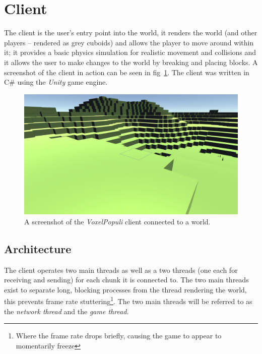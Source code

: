 \documentclass[12pt,notitlepage,a4paper]{report}
\newcommand{\unity}{\emph{Unity}}
\newcommand{\voxpop}{\emph{VoxelPopuli}}
\begin{document}
	\section{Client}
	\label{sec:client}
	The client is the user's entry point into the world, it renders the world (and other players -- rendered as grey cuboids) and allows the player to move around within it; it provides a basic physics simulation for realistic movement and collisions and it allows the user to make changes to the world by breaking and placing blocks. A screenshot of the client in action can be seen in fig~\ref{fig:client}. The client was written in C\# using the \unity{} game engine.
	
	\begin{figure}[!ht]
		\includegraphics[width=\textwidth]{client.png}
		\caption{A screenshot of the \voxpop{} client connected to a world.}
		\label{fig:client}
	\end{figure}
	
	\subsection{Architecture} %
	The client operates two main threads as well as a two threads (one each for receiving and sending) for each chunk it is connected to. The two main threads exist to separate long, blocking processes from the thread rendering the world, this prevents frame rate stuttering\footnote{Where the frame rate drops briefly, causing the game to appear to momentarily freeze}. The two main threads will be referred to as the \emph{network thread} and the \emph{game thread}.
	
\end{document}
